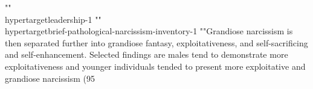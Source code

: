 {{{{{{{{{{{{{{{{{{{{{{{""\\hypertarget{leadership-1}{%
""\\hypertarget{brief-pathological-narcissism-inventory-1}{%
""Grandiose narcissism is then separated further into grandiose fantasy, exploitativeness, and self-sacrificing and self-enhancement. Selected findings are males tend to demonstrate more exploitativeness and younger individuals tended to present more exploitative and grandiose narcissism (95\\%
}}}}}}}}}}}}}}}}}}}}}}}}}
